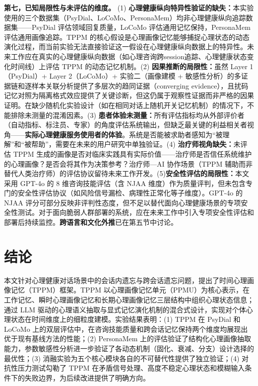 \documentclass[12pt,a4paper]{article}
\begin{document}
\textbf{第七，已知局限性与未评估的维度。}
(1) \textbf{心理健康纵向特异性验证的缺失：}本实验使用的三个数据集（PsyDial、LoCoMo、PersonaMem）均非心理健康纵向追踪数据集——PsyDial 评估领域回复质量，LoCoMo 评估通用记忆保持，PersonaMem 评估通用画像追踪。TPPM 的核心假设是心理画像记忆能够捕捉心理状态的动态演化过程，而当前实验无法直接验证这一假设在心理健康纵向数据上的特异性。未来工作应在真实的心理健康纵向数据（如心理咨询跨session追踪、心理健康状态变化时间线）上评估 TPPM 的动态记忆机制。(2) \textbf{因果推断的局限性：}虽然 Layer 1（PsyDial）+ Layer 2（LoCoMo）+ 实验二（画像建模 + 敏感性分析）的多证据链和逐样本关联分析提供了多层次的趋同证据（converging evidence），且扰码记忆对照为隔离格式效应提供了关键诊断，但这仍属于观察性证据而非严格的因果证明。在缺少随机化实验设计（如在相同对话上随机开关记忆机制）的情况下，不能排除未测量的混淆因素。(3) \textbf{患者体验未测量：}所有评估指标均从外部评价者（自动指标、标注员、专家）的角度评估系统输出，但缺乏最关键的利益相关者视角——\textbf{实际心理健康服务使用者的体验}。系统是否能被求助者感知为``被理解''和``被帮助''，需要在未来的用户研究中单独验证。(4) \textbf{治疗师视角缺失：}未评估 TPPM 生成的画像是否对临床实践具有实际价值——治疗师是否信任系统维护的心理画像？是否会将其作为决策参考？治疗师—AI 协作场景（TPPM 辅助而非替代人类治疗师）的评估协议留待未来工作开发。(5)\textbf{安全性评估的局限性：}本文采用 GPT-4o 的 8 维咨询技能评估（含 NJAA 维度）作为质量评判，但未包含专门的安全性评估协议（如风险信号漏检、病理性正常化等子维度）。GPT-4o 的 NJAA 评分可部分反映非评判性态度，但不足以替代面向心理健康场景的专项安全性测试。对于面向脆弱人群部署的系统，应在未来工作中引入专项安全性评估和部署后持续监控。\textbf{跨语言和文化外推}已在第五节中讨论。

\section{结论}

本文针对心理健康对话场景中的会话内遗忘与跨会话遗忘问题，提出了时间心理画像记忆（TPPM）框架。TPPM 以心理画像记忆单元（PPMU）为核心表示，在工作记忆、瞬时心理画像记忆和长期心理画像记忆三层结构中组织心理状态信息；通过 LLM 驱动的心理语义抽取与显式记忆演化机制的混合式设计，实现对个体心理状态在时间维度上的细粒度建模。实验结果表明：(1) TPPM 在 PsyDial 和 LoCoMo 上的双层评估中，在咨询技能质量和跨会话记忆保持两个维度均展现出优于现有基线方法的性能；(2) PersonaMem 上的评估验证了结构化心理画像抽取能力，参数敏感性分析进一步验证了各动态机制（固化、衰减、分支）设计选择的最优性；(3) 消融实验为五个核心模块各自的不可替代性提供了独立验证；(4) 对抗性压力测试勾勒了 TPPM 在矛盾信号处理、高度不稳定心理状态和模糊输入条件下的失败边界，为后续改进提供了明确方向。
\end{document}
